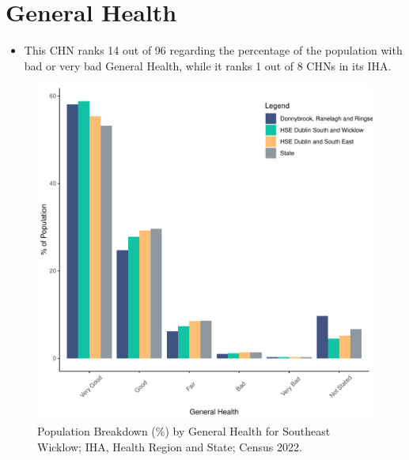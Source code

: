 \documentclass{article}
\begin{document}
\pagebreak

\section{General Health}\label{sect:GenHealth}
\begin{itemize}
\item  This CHN ranks  14 out of 96 regarding the percentage of the population with bad or very bad General Health, while it ranks   1 out of 8 CHNs in its IHA.
\end{itemize}
\begin{figure}[h]
	\centering
	\includegraphics[width = 150mm]{../figures/GenED.pdf}
	\caption{Population Breakdown (\%) by General Health for Southeast Wicklow; IHA, Health Region and State;  Census 2022.}
	\label{fig:2ae19629-1a6a-13a3-e055-000000000001}
	\end{figure}
\end{document}
